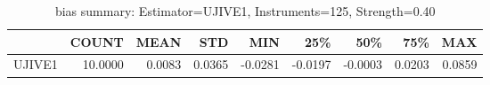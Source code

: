 \begin{table}[ht]
\centering
\caption{bias summary: Estimator=UJIVE1, Instruments=125, Strength=0.40}
\begin{tabular}{lrrrrrrrr}
\toprule
 & COUNT & MEAN & STD & MIN & 25\% & 50\% & 75\% & MAX \\
\midrule
UJIVE1 & 10.0000 & 0.0083 & 0.0365 & -0.0281 & -0.0197 & -0.0003 & 0.0203 & 0.0859 \\
\bottomrule
\end{tabular}
\end{table}
